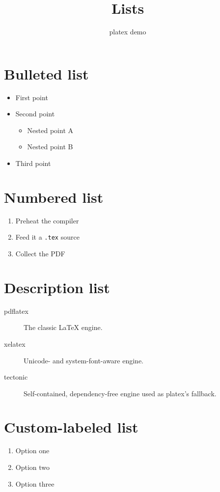 \documentclass{article}
\title{Lists}
\author{platex demo}
\date{}
\begin{document}
\maketitle

\section{Bulleted list}
\begin{itemize}
  \item First point
  \item Second point
  \begin{itemize}
    \item Nested point A
    \item Nested point B
  \end{itemize}
  \item Third point
\end{itemize}

\section{Numbered list}
\begin{enumerate}
  \item Preheat the compiler
  \item Feed it a \texttt{.tex} source
  \item Collect the PDF
\end{enumerate}

\section{Description list}
\begin{description}
  \item[pdflatex] The classic LaTeX engine.
  \item[xelatex] Unicode- and system-font-aware engine.
  \item[tectonic] Self-contained, dependency-free engine used as platex's fallback.
\end{description}

\section{Custom-labeled list}
\begin{enumerate}[label=(\alph*)]
  \item Option one
  \item Option two
  \item Option three
\end{enumerate}
\end{document}
